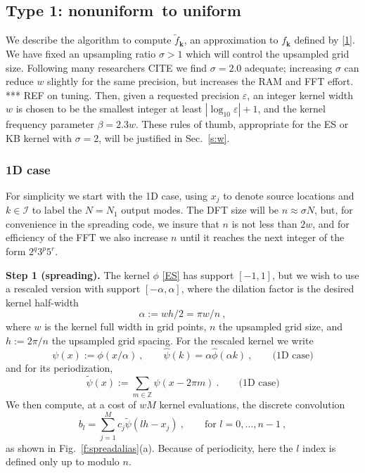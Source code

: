 \documentclass[10pt]{article}
\newcommand{\be}{\begin{equation}}
\newcommand{\ee}{\end{equation}}
\newcommand{\mbf}[1]{{\mathbf #1}}
\newcommand{\ZZ}{\mathbb{Z}}
\newcommand{\eps}{\varepsilon}
\newcommand{\bigO}{{\mathcal O}}
\newcommand{\kk}{\mbf{k}}
\newcommand{\KK}{{\mathcal I}}     %
\newcommand{\freq}{\beta}          %
\newcommand{\rat}{\sigma}          %
\newcommand{\ppsi}{{\tilde\psi}}   %
\newcommand{\al}{\alpha}           %
\newcommand{\NU}{{nonuniform}}       %
\newcommand{\U}{{uniform}}
\begin{document}
\subsection{Type 1: \NU\ to \U}

We describe the algorithm to compute $\tilde f_\kk$, an approximation
to $f_\kk$ defined by \eqref{1}.
We have fixed an upsampling ratio $\rat>1$ which will control the
upsampled grid size.
Following many researchers CITE we find $\rat=2.0$ adequate;
increasing $\rat$ can reduce $w$ slightly for the same precision,
but increases the RAM and FFT effort.
*** REF on tuning.
Then, given a requested precision $\eps$,
an integer kernel width $w$ is chosen
to be the smallest integer at least $|\log_{10} \eps| + 1$,
and the kernel frequency parameter $\freq = 2.3 w$.
These rules of thumb, appropriate for the ES or KB kernel with
$\rat=2$, will be justified in Sec.~\ref{s:w}.

\subsubsection{1D case}

For simplicity we start with the 1D case, using $x_j$ to denote source
locations and $k\in\KK$ to label the $N=N_1$ output modes.
The DFT size will be $n \approx \rat N$,
but, for convenience in the spreading code, we insure that $n$
is not less than $2w$,
and for efficiency of the FFT we also increase $n$ until it reaches the next
integer of the form $2^q3^p5^r$.

{\bf Step 1 (spreading).}
The kernel $\phi$ \eqref{ES} has support $[-1,1]$, but we wish to
use a rescaled version with support $[-\al,\al]$, where
the dilation factor is the desired kernel half-width
\be
\alpha := wh/2 = \pi w/n
~,
\label{al}
\ee
where $w$ is the kernel full width in grid points, $n$
the upsampled grid size, and $h := 2\pi/n$ the upsampled grid spacing.
For the rescaled kernel we write
\be
\psi(x) := \phi(x/\al)~,
\qquad \hat\psi(k) = \al \hat\phi(\al k)~,
\qquad \mbox{(1D case)}
\label{psi1}
\ee
and for its periodization,
\be
\ppsi(x) := \sum_{m\in\ZZ} \psi(x-2\pi m)
~.
\qquad \mbox{(1D case)}
\label{ppsi1}
\ee
We then compute, at a cost of $wM$ kernel evaluations, %
the discrete convolution
\be
b_l = \sum_{j=1}^M c_j \ppsi(lh - x_j)
~, \qquad \mbox{for } l=0,\dots,n-1
~,
\label{bl1}
\ee
as shown in Fig.~\ref{f:spreadalias}(a).
Because of periodicity, here the $l$ index is defined only up to modulo $n$.
\end{document}
